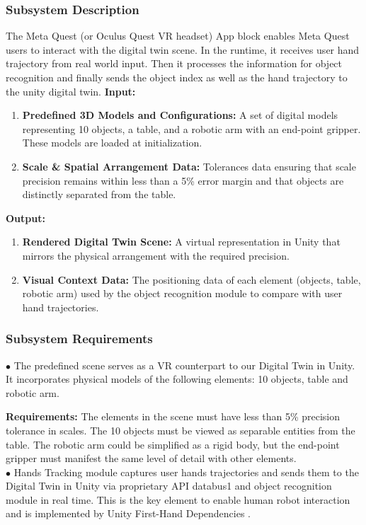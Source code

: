 \documentclass{senior-design}
\begin{document}
\subsubsection*{Subsystem Description}
The Meta Quest (or Oculus Quest VR headset) App block enables Meta Quest users to interact with the digital twin scene. In the runtime, it receives user hand trajectory from real world input. Then it processes the information for object recognition and finally sends the object index as well as the hand trajectory to the unity digital twin\cite{ARXroboticsX2025}. 
\textbf{Input:}  
\begin{enumerate}
    \item \textbf{Predefined 3D Models and Configurations:} A set of digital models representing 10 objects, a table, and a robotic arm with an end-point gripper. These models are loaded at initialization.
    \item \textbf{Scale \& Spatial Arrangement Data:} Tolerances data ensuring that scale precision remains within less than a 5\% error margin and that objects are distinctly separated from the table.
\end{enumerate}
\textbf{Output:} 
\begin{enumerate}
    \item \textbf{Rendered Digital Twin Scene:} A virtual representation in Unity that mirrors the physical arrangement with the required precision. 
    \item \textbf{Visual Context Data:} The positioning data of each element (objects, table, robotic arm) used by the object recognition module to compare with user hand trajectories. 
\end{enumerate}
\subsubsection*{Subsystem Requirements}
$\bullet$ The predefined scene serves as a VR counterpart to our Digital Twin in Unity. It incorporates physical models of the following elements: 10 objects, table and robotic arm. 

 

\textbf{Requirements:} The elements in the scene must have less than 5\% precision tolerance in scales. The 10 objects must be viewed as separable entities from the table. The robotic arm could be simplified as a rigid body, but the end-point gripper must manifest the same level of detail with other elements. 
\\
 

$\bullet$ Hands Tracking module captures user hands trajectories and sends them to the Digital Twin in Unity via proprietary API databus1 and object recognition module in real time. This is the key element to enable human robot interaction and is implemented by Unity First-Hand Dependencies \cite{unity-firsthand}. 
\end{document}
